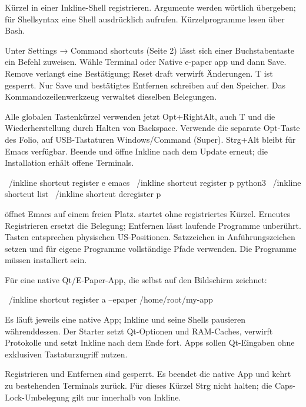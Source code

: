 Kürzel in einer Inkline-Shell registrieren. Argumente werden wörtlich übergeben;
für Shellsyntax eine Shell ausdrücklich aufrufen. Kürzelprogramme lesen
 über Bash.

Unter Settings → Command shortcuts (Seite 2) lässt sich einer Buchstabentaste ein Befehl zuweisen. Wähle Terminal oder Native e-paper app und dann Save. Remove verlangt eine Bestätigung; Reset draft verwirft Änderungen. T ist gesperrt. Nur Save und bestätigtes Entfernen schreiben auf den Speicher. Das Kommandozeilenwerkzeug verwaltet dieselben Belegungen.

Alle globalen Tastenkürzel verwenden jetzt Opt+RightAlt, auch T und die Wiederherstellung durch Halten von Backspace. Verwende die separate Opt-Taste des Folio, auf USB-Tastaturen Windows/Command (Super). Strg+Alt bleibt für Emacs verfügbar. Beende und öffne Inkline nach dem Update erneut; die Installation erhält offene Terminals.

\begin{shell}
~/inkline shortcut register e emacs
~/inkline shortcut register p python3
~/inkline shortcut list
~/inkline shortcut deregister p
\end{shell}

 öffnet Emacs auf einem freien Platz.
 startet ohne registriertes Kürzel.
Erneutes Registrieren ersetzt die Belegung; Entfernen lässt laufende Programme
unberührt. Tasten entsprechen physischen US-Positionen. Satzzeichen in
Anführungszeichen setzen und für eigene Programme vollständige Pfade verwenden.
Die Programme müssen installiert sein.

Für eine native Qt/E-Paper-App, die selbst auf den Bildschirm zeichnet:
\begin{shell}
~/inkline shortcut register a --epaper /home/root/my-app
\end{shell}
Es läuft jeweils eine native App; Inkline und seine Shells pausieren währenddessen.
Der Starter setzt Qt-Optionen und RAM-Caches, verwirft Protokolle und setzt
Inkline nach dem Ende fort. Apps sollen Qt-Eingaben ohne exklusiven Tastaturzugriff nutzen.

\begin{notice}
 Registrieren und Entfernen sind gesperrt.
Es beendet die native App und kehrt zu bestehenden Terminals zurück.
Für dieses Kürzel Strg nicht halten; die Caps-Lock-Umbelegung gilt nur innerhalb von Inkline.
\end{notice}

